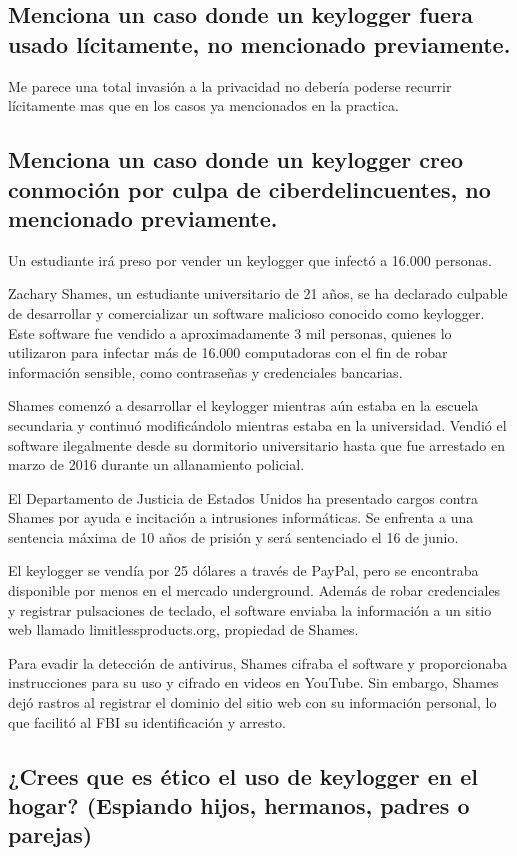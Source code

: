 \subsection{Menciona un caso donde un keylogger fuera usado lícitamente, no mencionado previamente.}

Me parece una total invasión a la privacidad no debería poderse recurrir lícitamente mas que en los casos ya mencionados en la practica.

\subsection{Menciona un caso donde un keylogger creo conmoción por culpa de ciberdelincuentes, no mencionado previamente.}

Un estudiante irá preso por vender un keylogger que infectó a 16.000 personas.

Zachary Shames, un estudiante universitario de 21 años, se ha declarado culpable de desarrollar y comercializar un software malicioso conocido como keylogger. Este software fue vendido a aproximadamente 3 mil personas, quienes lo utilizaron para infectar más de 16.000 computadoras con el fin de robar información sensible, como contraseñas y credenciales bancarias.

Shames comenzó a desarrollar el keylogger mientras aún estaba en la escuela secundaria y continuó modificándolo mientras estaba en la universidad. Vendió el software ilegalmente desde su dormitorio universitario hasta que fue arrestado en marzo de 2016 durante un allanamiento policial.

El Departamento de Justicia de Estados Unidos ha presentado cargos contra Shames por ayuda e incitación a intrusiones informáticas. Se enfrenta a una sentencia máxima de 10 años de prisión y será sentenciado el 16 de junio.

El keylogger se vendía por 25 dólares a través de PayPal, pero se encontraba disponible por menos en el mercado underground. Además de robar credenciales y registrar pulsaciones de teclado, el software enviaba la información a un sitio web llamado limitlessproducts.org, propiedad de Shames.

Para evadir la detección de antivirus, Shames cifraba el software y proporcionaba instrucciones para su uso y cifrado en videos en YouTube. Sin embargo, Shames dejó rastros al registrar el dominio del sitio web con su información personal, lo que facilitó al FBI su identificación y arresto.

\subsection{¿Crees que es ético el uso de keylogger en el hogar? (Espiando hijos, hermanos, padres o parejas)}

